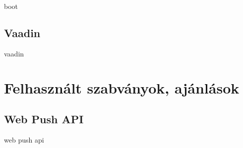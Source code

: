 boot



\subsection{Vaadin}

vaadin

\section{Felhasznált szabványok, ajánlások}








\subsection{Web Push API}

web push api